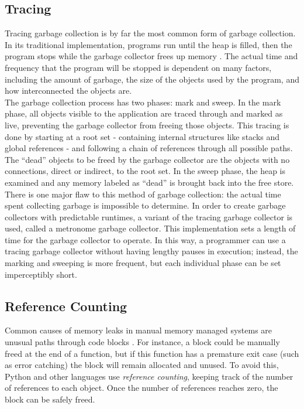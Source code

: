 \documentclass[12pt]{article}
\begin{document}
\subsection{Tracing}
Tracing garbage collection is by far the most common form of garbage collection. In its traditional implementation, programs run until the heap is filled, then the program stops while the garbage collector frees up memory \cite{ibmJava}. The actual time and frequency that the program will be stopped is dependent on many factors, including the amount of garbage, the size of the objects used by the program, and how interconnected the objects are.\\

The garbage collection process has two phases: mark and sweep. In the mark phase, all objects visible to the application are traced through and marked as live, preventing the garbage collector from freeing those objects. This tracing is done by starting at a root set - containing internal structures like stacks and global references - and following a chain of references through all possible paths. The ``dead'' objects to be freed by the garbage collector are the objects with no connections, direct or indirect, to the root set. In the sweep phase, the heap is examined and any memory labeled as ``dead'' is brought back into the free store.\\

There is one major flaw to this method of garbage collection: the actual time spent collecting garbage is impossible to determine. In order to create garbage collectors with predictable runtimes, a variant of the tracing garbage collector is used, called a metronome garbage collector. This implementation sets a length of time for the garbage collector to operate. In this way, a programmer can use a tracing garbage collector without having lengthy pauses in execution; instead, the marking and sweeping is more frequent, but each individual phase can be set imperceptibly short.
\subsection{Reference Counting}
Common causes of memory leaks in manual memory managed systems are unusual paths through code blocks \cite{pythDocs}. For instance, a block could be manually freed at the end of a function, but if this function has a premature exit case (such as error catching) the block will remain allocated and unused. To avoid this, Python and other languages use {\it reference counting}, keeping track of the number of references to each object. Once the number of references reaches zero, the block can be safely freed.\\
\end{document}
